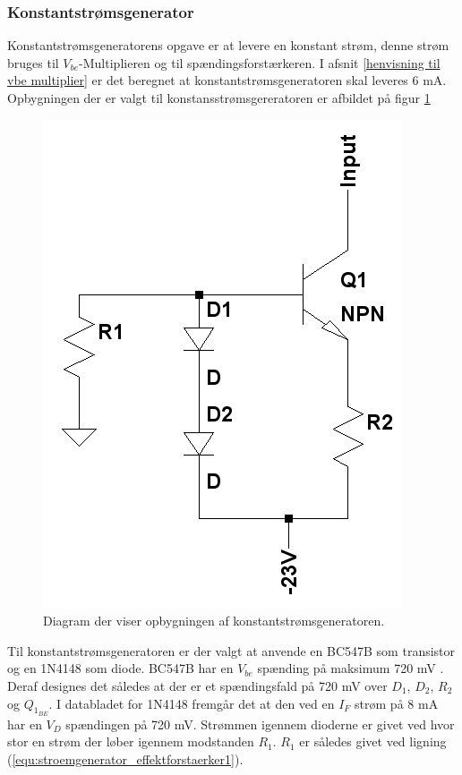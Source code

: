 \subsubsection*{Konstantstrømsgenerator}
Konstantstrømsgeneratorens opgave er at levere en konstant strøm, denne strøm bruges til $V_{be}$-Multiplieren og til spændingsforstærkeren. I afsnit \ref{henvisning til vbe multiplier} er det beregnet at konstantstrømsgeneratoren skal leveres 6 mA. Opbygningen der er valgt til konstansstrømsgereratoren er afbildet på figur \ref{konstantstroemsgenerator_model}

\begin{figure}[h]
\centering
\includegraphics[scale=0.35]{teknisk/effektforstaerker/stoemgenerator.png}
\caption{Diagram der viser opbygningen af konstantstrømsgeneratoren.}
\label{konstantstroemsgenerator_model}
\end{figure}

Til konstantstrømsgeneratoren er der valgt at anvende en BC547B som transistor og en 1N4148 som diode. BC547B har en $V_{be}$ spænding på maksimum 720 mV . Deraf designes det således at der er et spændingsfald på 720 mV over $D_1$, $D_2$, $R_{2}$ og $Q_{1_{BE}}$. I databladet for 1N4148 fremgår det at den  ved en $I_F$ strøm på 8 mA har en $V_D$ spændingen på 720 mV. Strømmen igennem dioderne er givet ved hvor stor en strøm der løber igennem modstanden $R_{1}$. $R_{1}$ er således givet ved ligning (\ref{equ:stroemgenerator_effektforstaerker1}).

